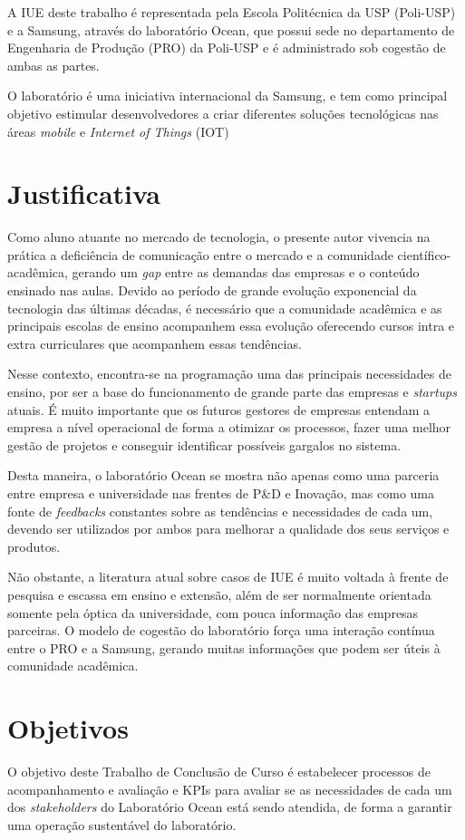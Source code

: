 A IUE deste trabalho é representada pela Escola Politécnica da USP (Poli-USP) e a Samsung, através do laboratório Ocean, que possui sede no departamento de Engenharia de Produção (PRO) da Poli-USP e é administrado sob cogestão de ambas as partes.

O laboratório é uma iniciativa internacional da Samsung, e tem como principal objetivo estimular desenvolvedores a criar diferentes soluções tecnológicas nas áreas \textit{mobile} e \textit{Internet of Things} (IOT)

\section{Justificativa}
\label{cha:justificativa}

Como aluno atuante no mercado de tecnologia, o presente autor vivencia na prática a deficiência de comunicação entre o mercado e a comunidade científico-acadêmica, gerando um \textit{gap} entre as demandas das empresas e o conteúdo ensinado nas aulas. Devido ao período de grande evolução exponencial da tecnologia das últimas décadas, é necessário que a comunidade acadêmica e as principais escolas de ensino acompanhem essa evolução oferecendo cursos intra e extra curriculares que acompanhem essas tendências.

Nesse contexto, encontra-se na programação uma das principais necessidades de ensino, por ser a base do funcionamento de grande parte das empresas e \textit{startups} atuais. É muito importante que os futuros gestores de empresas entendam a empresa a nível operacional de forma a otimizar os processos, fazer uma melhor gestão de projetos e conseguir identificar possíveis gargalos no sistema.

Desta maneira, o laboratório Ocean se mostra não apenas como uma parceria entre empresa e universidade nas frentes de  P\&D e Inovação, mas como uma fonte de \textit{feedbacks} constantes sobre as tendências e necessidades de cada um, devendo ser utilizados por ambos para melhorar a qualidade dos seus serviços e produtos.

Não obstante, a literatura atual sobre casos de IUE é muito voltada à frente de pesquisa e escassa em ensino e extensão, além de ser normalmente orientada somente pela óptica da universidade, com pouca informação das empresas parceiras. O modelo de cogestão do laboratório força uma interação contínua entre o PRO e a Samsung, gerando muitas informações que podem ser úteis à comunidade acadêmica. 

\section[Objetivos]{Objetivos}
\label{chap:objetivos}

O objetivo deste Trabalho de Conclusão de Curso é estabelecer processos de acompanhamento e avaliação e KPIs para avaliar se as necessidades de cada um dos \textit{stakeholders} do Laboratório Ocean está sendo atendida, de forma a garantir uma operação sustentável do laboratório.